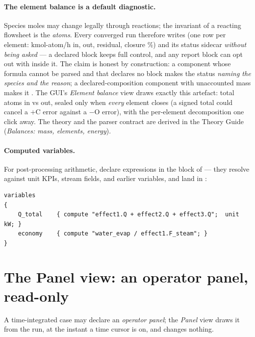 \documentclass[11pt,a4paper]{article}
\begin{document}
\paragraph{The element balance is a default diagnostic.}\label{sec:element-balance}
Species moles may change legally through reactions; the invariant of a
reacting flowsheet is the \emph{atoms}.  Every converged
 run therefore writes
 (one row per element:
kmol-atom/h in, out, residual, closure \%) and its
 status sidecar \emph{without being asked} ---
a declared  block keeps full control, and any
report block can opt out with  inside it.  The
claim is honest by construction: a component whose formula cannot be
parsed and that declares no  block makes
the status  \emph{naming the species and the reason};
a declared-composition component with unaccounted mass makes it
.  The GUI's \emph{Element balance} view draws exactly
this artefact: total atoms in vs out, sealed only when \emph{every}
element closes (a signed total could cancel a $+$C error against a
$-$O error), with the per-element decomposition one click away.  The
theory and the parser contract are derived in the Theory Guide
(\emph{Balances: mass, elements, energy}).

\paragraph{Computed variables.}  For post-processing arithmetic,
declare  expressions in the  block of
 --- they resolve against unit KPIs, stream fields,
and earlier variables, and land in :

\begin{lstlisting}[language=dict]
variables
{
    Q_total    { compute "effect1.Q + effect2.Q + effect3.Q";  unit kW; }
    economy    { compute "water_evap / effect1.F_steam"; }
}
\end{lstlisting}

\section{The Panel view: an operator panel, read-only}\label{sec:panelWorkspace}

\begin{whatyoulllearn}
A time-integrated case may declare an \emph{operator panel}; the
\emph{Panel} view draws it from the run, at the instant a time cursor is
on, and changes nothing.
\end{whatyoulllearn}
\end{document}
